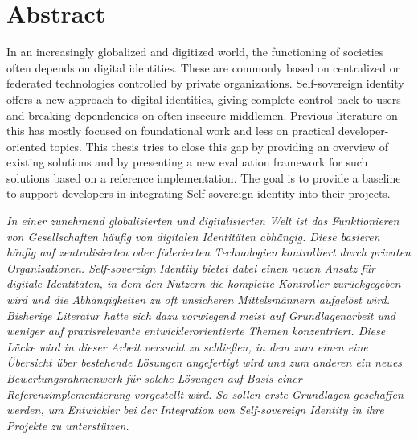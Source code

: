 \chapter*{Abstract}

In an increasingly globalized and digitized world, the functioning of societies often depends on digital identities. These are commonly based on centralized or federated technologies controlled by private organizations. Self-sovereign identity offers a new approach to digital identities, giving complete control back to users and breaking dependencies on often insecure middlemen. Previous literature on this has mostly focused on foundational work and less on practical developer-oriented topics. This thesis tries to close this gap by providing an overview of existing solutions and by presenting a new evaluation framework for such solutions based on a reference implementation. The goal is to provide a baseline to support developers in integrating Self-sovereign identity into their projects.

\textit{In einer zunehmend globalisierten und digitalisierten Welt ist das Funktionieren von Gesellschaften häufig von digitalen Identitäten abhängig. Diese basieren häufig auf zentralisierten oder föderierten Technologien kontrolliert durch privaten Organisationen. Self-sovereign Identity bietet dabei einen neuen Ansatz für digitale Identitäten, in dem den Nutzern die komplette Kontroller zurückgegeben wird und die Abhängigkeiten zu oft unsicheren Mittelsmännern aufgelöst wird. Bisherige Literatur hatte sich dazu vorwiegend meist auf Grundlagenarbeit und weniger auf praxisrelevante entwicklerorientierte Themen konzentriert. Diese Lücke wird in dieser Arbeit versucht zu schließen, in dem zum einen eine Übersicht über bestehende Lösungen angefertigt wird und zum anderen ein neues Bewertungsrahmenwerk für solche Lösungen auf Basis einer Referenzimplementierung vorgestellt wird. So sollen erste Grundlagen geschaffen werden, um Entwickler bei der Integration von Self-sovereign Identity in ihre Projekte zu unterstützen.}

